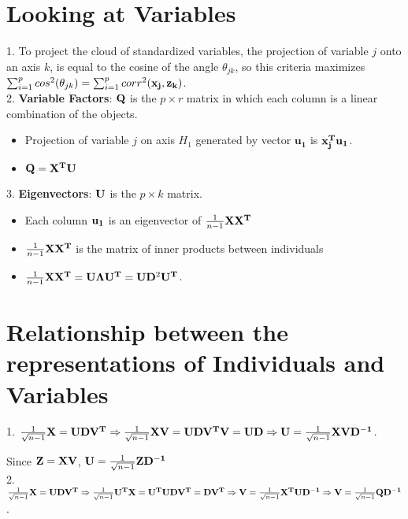 \documentclass[11pt]{article}
\begin{document}
\section{Looking at Variables}

1. To project the cloud of standardized variables, the projection of variable $j$ onto an axis $k$, is equal to the cosine of the angle $\theta_{jk}$, so this criteria maximizes $\sum_{i=1}^p cos^2(\theta_{jk}) = \sum_{i=1}^p corr^2({\bf x_j}, {\bf z_k})$. \\

\hspace{-0.68cm} 2. \textbf{Variable Factors}: $\bf Q$ is the $p \times r$ matrix in which each column is a linear combination of the objects. 
\begin{itemize}
	\item Projection of variable $j$ on axis $H_1$ generated by vector $\mathbf{u_1}$ is ${\bf x_j^T}{\bf u_1}$.
	\item ${\bf Q} = {\bf X^TU}$
\end{itemize}

\hspace{-0.68cm} 3. \textbf{Eigenvectors}: $\bf U$ is the $p \times k$ matrix.
\begin{itemize}
	\item Each column $\bf u_1$ is an eigenvector of $\frac{1}{n-1}{\bf X}{\bf X^T}$
	\item $\frac{1}{n-1}{\bf X}{\bf X^T}$ is the matrix of inner products between individuals
	\item $\frac{1}{n-1}{\bf X}{\bf X^T} = {\bf U\Lambda U^T} = {\bf U}{\bf D}^2{\bf U^T}$. 
\end{itemize}

\section{Relationship between the representations of Individuals and Variables}

1. $\frac{1}{\sqrt{n-1}}{\bf X} = {\bf UDV^T} \Rightarrow \frac{1}{\sqrt{n-1}}{\bf XV} = {\bf UDV^TV} = {\bf UD} \Rightarrow {\bf U} = \frac{1}{\sqrt{n-1}}{\bf XVD^{-1}}$.

\hspace{-0.68cm} Since ${\bf Z} = {\bf XV}$, ${\bf U} = \frac{1}{\sqrt{n-1}}{\bf ZD^{-1}}$ \\

\hspace{-0.68cm} 2. $\frac{1}{\sqrt{n-1}}{\bf X} = {\bf UDV^T} \Rightarrow \frac{1}{\sqrt{n-1}}{\bf U^TX} = {\bf U^TUDV^T} = {\bf DV^T} \Rightarrow \\
{\bf V} = \frac{1}{\sqrt{n-1}}{\bf X^TUD^{-1}} \Rightarrow {\bf V}= \frac{1}{\sqrt{n-1}}{\bf QD^{-1}}$. \\
\end{document}
